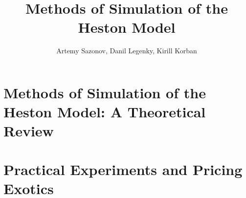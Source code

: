 \documentclass{vegareport}
\title{Methods of Simulation of the Heston Model}
\author{Artemy Sazonov, Danil Legenky, Kirill Korban}
\begin{document}
    \maketitle

    \introduction
        
    
    \part{Methods of Simulation of the Heston Model: A Theoretical Review}
        

    \part{Practical Experiments and Pricing Exotics}
        
    
    \conclusion
        

\end{document}
